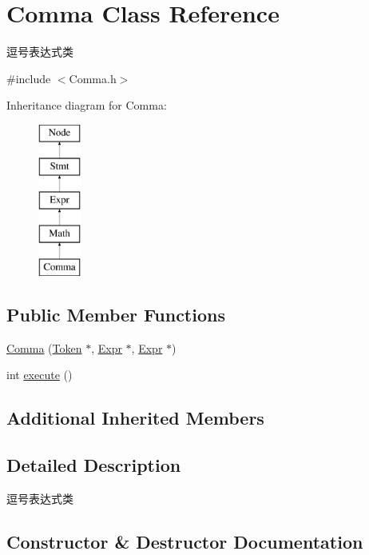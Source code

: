 \hypertarget{class_comma}{}\section{Comma Class Reference}
\label{class_comma}


逗号表达式类  




{\ttfamily \#include $<$Comma.\+h$>$}

Inheritance diagram for Comma\+:\begin{figure}[H]
\begin{center}
\leavevmode
\includegraphics[height=5.000000cm]{class_comma}
\end{center}
\end{figure}
\subsection*{Public Member Functions}
\begin{DoxyCompactItemize}
\item 
\hyperlink{class_comma_a53c0fef57ecec72be524b054ab6b3ae6}{Comma} (\hyperlink{class_token}{Token} $\ast$, \hyperlink{class_expr}{Expr} $\ast$, \hyperlink{class_expr}{Expr} $\ast$)
\item 
int \hyperlink{class_comma_aab9ca2bb70a10abd2fb263de745f843a}{execute} ()
\end{DoxyCompactItemize}
\subsection*{Additional Inherited Members}


\subsection{Detailed Description}
逗号表达式类 

\subsection{Constructor \& Destructor Documentation}
\mbox{\label{class_comma_a53c0fef57ecec72be524b054ab6b3ae6}} 
